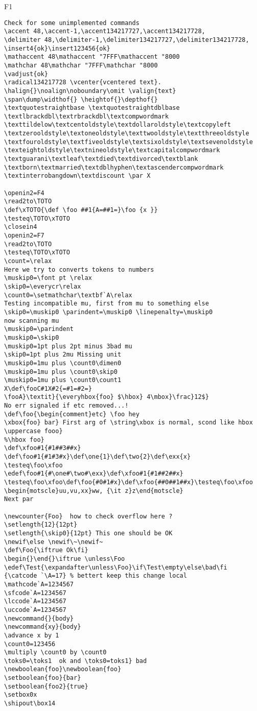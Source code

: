 \documentclass{article}
\begin{document}
\begin{filecontents+}{F1}
\begin{Verbatim}
Check for some unimplemented commands
\accent 48,\accent-1,\accent134217727,\accent134217728, 
\delimiter 48,\delimiter-1,\delimiter134217727,\delimiter134217728, 
\insert4{ok}\insert123456{ok}
\mathaccent 48\mathaccent "7FFF\mathaccent "8000
\mathchar 48\mathchar "7FFF\mathchar "8000
\vadjust{ok}
\radical134217728 \vcenter{vcentered text}.
\halign{}\noalign\noboundary\omit \valign{text}
\span\dump\widthof{} \heightof{}\depthof{}
\textquotestraightbase \textquotestraightdblbase
\textlbrackdbl\textrbrackdbl\textcompwordmark
\texttildelow\textcentoldstyle\textdollaroldstyle\textcopyleft
\textzerooldstyle\textoneoldstyle\texttwooldstyle\textthreeoldstyle
\textfouroldstyle\textfiveoldstyle\textsixoldstyle\textsevenoldstyle
\texteightoldstyle\textnineoldstyle\textcapitalcompwordmark
\textguarani\textleaf\textdied\textdivorced\textblank
\textborn\textmarried\textdblhyphen\textascendercompwordmark
\textinterrobangdown\textdiscount \par X

\openin2=F4
\read2to\TOTO
\def\xTOTO{\def \foo ##1{A=##1=}\foo {x }}
\testeq\TOTO\xTOTO
\closein4
\openin2=F7
\read2to\TOTO
\testeq\TOTO\xTOTO
\count=\relax
Here we try to converts tokens to numbers
\muskip0=\font pt \relax
\skip0=\everycr\relax 
\count0=\setmathchar\textbf`A\relax
Testing incompatible mu, first from mu to something else
\skip0=\muskip0 \parindent=\muskip0 \linepenalty=\muskip0
now scanning mu
\muskip0=\parindent 
\muskip0=\skip0 
\muskip0=1pt plus 2pt minus 3bad mu
\skip0=1pt plus 2mu Missing unit
\muskip0=1mu plus \count0\dimen0
\muskip0=1mu plus \count0\skip0
\muskip0=1mu plus \count0\count1
X\def\fooC#1X#2{=#1=#2=}
\fooA}\textit}{\everyhbox{foo} $\hbox} 4\mbox}\frac}12$}
No err signaled if etc removed...!
\def\foo{\begin{comment}etc} \foo hey
\xbox{foo} bar} First arg of \string\xbox is normal, scond like hbox 
\uppercase fooo}
%\hbox foo}
\def\xfoo#1{#1##3##x}
\def\foo#1{#1#3#x}\def\one{1}\def\two{2}\def\exx{x}
\testeq\foo\xfoo
\edef\foo#1{#\one#\two#\exx}\def\xfoo#1{#1##2##x}
\testeq\foo\xfoo\def\foo{#0#1#x}\def\xfoo{##0##1##x}\testeq\foo\xfoo
\begin{motscle}uu,vu,xx}ww, {\it z}z\end{motscle}
Next par

\newcounter{Foo}  how to check overflow here ?
\setlength{12}{12pt}
\setlength{\skip0}{12pt} This one should be OK
\newif\else \newif\~\newif~
\def\Foo{\iftrue Ok\fi}
\begin{}\end{}\iftrue \unless\Foo
\edef\Test{\expandafter\unless\Foo}\if\Test\empty\else\bad\fi
{\catcode `\A=17} % bettert keep this change local
\mathcode`A=1234567
\sfcode`A=1234567
\lccode`A=1234567
\uccode`A=1234567
\newcommand{}{body}
\newcommand{xy}{body}
\advance x by 1
\count0=123456
\multiply \count0 by \count0
\toks0=\toks1  ok and \toks0=toks1} bad
\newboolean{foo}\newboolean{foo}
\setboolean{foo}{bar}
\setboolean{foo2}{true}
\setbox0x
\shipout\box14


\end{Verbatim}
\end{filecontents+}
\end{document}
